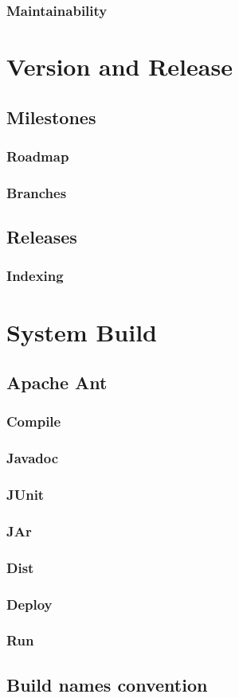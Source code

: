 \documentclass{report}
\begin{document}
\subsection{Maintainability}

\chapter{Version and Release}
\section{Milestones}
\subsection{Roadmap}
\subsection{Branches}
\section{Releases}
\subsection{Indexing}

\chapter{System Build}
\section{Apache Ant}
\subsection{Compile}
\subsection{Javadoc}
\subsection{JUnit}
\subsection{JAr}
\subsection{Dist}
\subsection{Deploy}
\subsection{Run}
\section{Build names convention}
\end{document}
